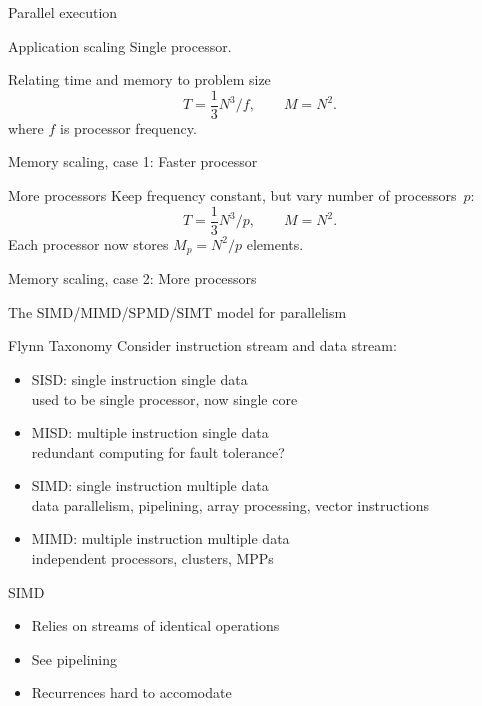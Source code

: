 \begin{exercise}{Parallel execution}
    
\end{exercise}

\begin{numberedframe}{Application scaling}
  Single processor.

  Relating time and memory to problem size
  \[ T=\frac 13 N^3/f,\qquad M=N^2. \]
  where $f$ is processor frequency.
\end{numberedframe}

\begin{exercise}{Memory scaling, case 1: Faster processor}
  
\end{exercise}

\begin{numberedframe}{More processors}
  Keep frequency constant, but vary number of processors~$p$:
  \[ T=\frac 13 N^3/p,\qquad M=N^2. \]
  Each processor now stores $M_p=N^2/p$ elements.  
\end{numberedframe}

\begin{exercise}{Memory scaling, case 2: More processors}
  
\end{exercise}

 {The SIMD/MIMD/SPMD/SIMT model for parallelism}

\begin{numberedframe}{Flynn Taxonomy}
  Consider instruction stream and data stream:
  \begin{itemize}
  \item SISD: single instruction single data\\
    used to be single processor, now single core
  \item MISD: multiple instruction single data\\
    redundant computing for fault tolerance?
  \item SIMD: single instruction multiple data\\
    data parallelism, pipelining, array processing, vector instructions
  \item MIMD: multiple instruction multiple data\\
    independent processors, clusters, MPPs
  \end{itemize}
\end{numberedframe}

\begin{numberedframe}{SIMD}
  \begin{itemize}
  \item Relies on streams of identical operations
  \item See pipelining
  \item Recurrences hard to accomodate
  \end{itemize}
\end{numberedframe}

